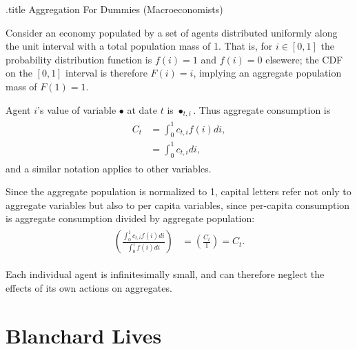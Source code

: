 \documentclass{handout}
\begin{document}
\handoutHeader


\begin{verbatimwrite}{\jobname.title}
Aggregation For Dummies (Macroeconomists)
\end{verbatimwrite}

\handoutNameMake



Consider an economy populated by a set of agents distributed uniformly along 
the unit interval with a total population mass of 1.  That is, for $i \in [0,1]$ the 
probability distribution function is $f(i) = 1$ and $f(i)=0$ elsewere; the CDF on the $[0,1]$ interval is therefore
$F(i)=i$, implying an aggregate population mass of $F(1)=1$.  

Agent $i$'s value of variable $\bullet$ at date $t$ is $\bullet_{t,i}$.
Thus aggregate consumption is 
\begin{equation}\begin{gathered}\begin{aligned}
  C_{t} & =  \int_{0}^{1} c_{t,i} f(i) di,
\\ & =  \int_{0}^{1} c_{t,i} di,
\end{aligned}\end{gathered}\end{equation}
and a similar notation applies to other variables.

Since the aggregate population is normalized to 1, capital
letters refer not only to aggregate variables but also to
per capita variables, since per-capita consumption is 
aggregate consumption divided by aggregate population:
\begin{equation}\begin{gathered}\begin{aligned}
  \left(\frac{\int_{0}^{1} c_{t,i} f(i) di}{\int_{0}^{1} f(i) di}\right) & =  \left(\frac{C_{t}}{1}\right) = C_{t}.
\end{aligned}\end{gathered}\end{equation}

Each individual agent is infinitesimally small, and can therefore
neglect the effects of its own actions on aggregates.

\section{Blanchard Lives}
\end{document}
